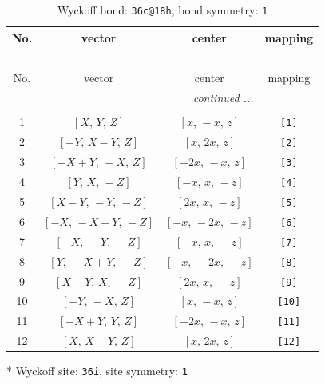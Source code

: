 \documentclass[fleqn,8pt]{jsarticle}
\begin{document}
\begin{longtable}{cccc}
\caption{Wyckoff bond: {\tt 36c@18h}, bond symmetry: {\tt 1}}
 \\
 \hline \hline
No. & vector & center & mapping \\ \hline \endfirsthead

\multicolumn{3}{l}{\tablename\ \thetable{}} \\
 \hline \hline
No. & vector & center & mapping \\ \hline \endhead

 \hline \hline
\multicolumn{3}{r}{\footnotesize\it continued ...} \\ \endfoot

 \hline \hline
\multicolumn{3}{r}{} \\ \endlastfoot

1 & $\left[ X,\, Y,\, Z \right]$ & $\left[ x,\, - x,\, z \right]$ & {\tt [1]} \\ \hline
2 & $\left[ - Y,\, X - Y,\, Z \right]$ & $\left[ x,\, 2 x,\, z \right]$ & {\tt [2]} \\ \hline
3 & $\left[ - X + Y,\, - X,\, Z \right]$ & $\left[ - 2 x,\, - x,\, z \right]$ & {\tt [3]} \\ \hline
4 & $\left[ Y,\, X,\, - Z \right]$ & $\left[ - x,\, x,\, - z \right]$ & {\tt [4]} \\ \hline
5 & $\left[ X - Y,\, - Y,\, - Z \right]$ & $\left[ 2 x,\, x,\, - z \right]$ & {\tt [5]} \\ \hline
6 & $\left[ - X,\, - X + Y,\, - Z \right]$ & $\left[ - x,\, - 2 x,\, - z \right]$ & {\tt [6]} \\ \hline
7 & $\left[ - X,\, - Y,\, - Z \right]$ & $\left[ - x,\, x,\, - z \right]$ & {\tt [7]} \\ \hline
8 & $\left[ Y,\, - X + Y,\, - Z \right]$ & $\left[ - x,\, - 2 x,\, - z \right]$ & {\tt [8]} \\ \hline
9 & $\left[ X - Y,\, X,\, - Z \right]$ & $\left[ 2 x,\, x,\, - z \right]$ & {\tt [9]} \\ \hline
10 & $\left[ - Y,\, - X,\, Z \right]$ & $\left[ x,\, - x,\, z \right]$ & {\tt [10]} \\ \hline
11 & $\left[ - X + Y,\, Y,\, Z \right]$ & $\left[ - 2 x,\, - x,\, z \right]$ & {\tt [11]} \\ \hline
12 & $\left[ X,\, X - Y,\, Z \right]$ & $\left[ x,\, 2 x,\, z \right]$ & {\tt [12]} \\
\end{longtable}
* Wyckoff site: {\tt 36i}, site symmetry: {\tt 1}
\renewcommand{\arraystretch}{1.2}
\end{document}
